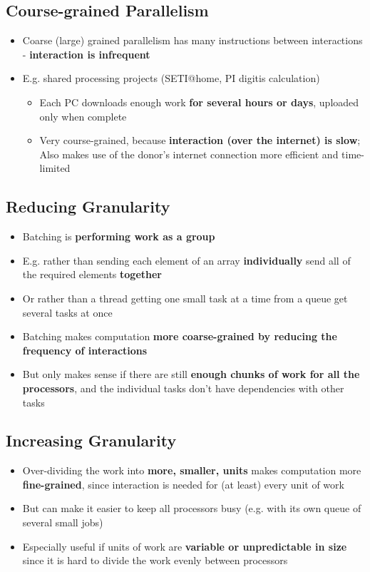 \documentclass{article}
\begin{document}
\subsection{Course-grained Parallelism}
\begin{itemize}
  \item Coarse (large) grained parallelism has many instructions between interactions - \textbf{interaction is infrequent}
  \item E.g. shared processing projects (SETI@home, PI digitis calculation)
  \begin{itemize}
    \item Each PC downloads enough work \textbf{for several hours or days}, uploaded only when complete
    \item Very course-grained, because \textbf{interaction (over the internet) is slow}; Also makes use of the donor’s internet connection more efficient and time-limited
  \end{itemize}
\end{itemize}

\subsection{Reducing Granularity}  
\begin{itemize}
  \item Batching is \textbf{performing work as a group}
  \item E.g. rather than sending each element of an array \textbf{individually} send all of the required elements \textbf{together} 
  \item Or rather than a thread getting one small task at a time from a queue get several tasks at once 
  \item Batching makes computation \textbf{more coarse-grained by reducing the frequency of interactions}
  \item But only makes sense if there are still\textbf{ enough chunks of work for all the processors}, and the individual tasks don’t have dependencies with other tasks
\end{itemize}

\subsection{Increasing Granularity}
\begin{itemize}
  \item Over-dividing the work into \textbf{more, smaller, units} makes computation more \textbf{fine-grained}, since interaction is needed for (at least) every unit of work 
  \item But can make it easier to keep all processors busy (e.g. with its own queue of several small jobs)
  \item Especially useful if units of work are \textbf{variable or unpredictable in size} since it is hard to divide the work evenly between processors
\end{itemize}
\end{document}
